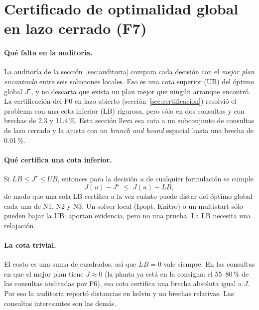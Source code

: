 \section{Certificado de optimalidad global en lazo cerrado (F7)}\label{sec:f7}
\paragraph{Qué falta en la auditoría.} La auditoría de la sección~\ref{sec:auditoria} compara
cada decisión con el \emph{mejor plan encontrado} entre seis soluciones locales. Eso es una cota
superior (UB) del óptimo global $J^\star$, y no descarta que exista un plan mejor que ningún
arranque encontró. La certificación del P0 en lazo abierto (sección~\ref{sec:certificacion})
resolvió el problema con una cota inferior (LB) rigurosa, pero sólo en dos consultas y con
brechas de 2.3 y 11.4\,\%. Esta sección lleva esa cota a un subconjunto de consultas de lazo
cerrado y la ajusta con un \emph{branch and bound} espacial hasta una brecha de 0.01\,\%.

\paragraph{Qué certifica una cota inferior.} Si $LB\le J^\star\le UB$, entonces para la
decisión $u$ de cualquier formulación se cumple
\[
J(u)-J^\star\;\le\;J(u)-LB ,
\]
de modo que una sola LB certifica a la vez cuánto puede distar del óptimo global cada una de
N1, N2 y N3. Un solver local (Ipopt, Knitro) o un multistart sólo pueden bajar la UB: aportan
evidencia, pero no una prueba. La LB necesita una relajación.

\paragraph{La cota trivial.} El costo es una suma de cuadrados, así que $LB=0$ vale siempre. En
las consultas en que el mejor plan tiene $J\approx0$ (la planta ya está en la consigna: el
55--80\,\% de las consultas auditadas por F6), esa cota certifica una brecha absoluta igual a
$J$. Por eso la auditoría reportó distancias en kelvin y no brechas relativas. Las consultas
interesantes son las demás.

